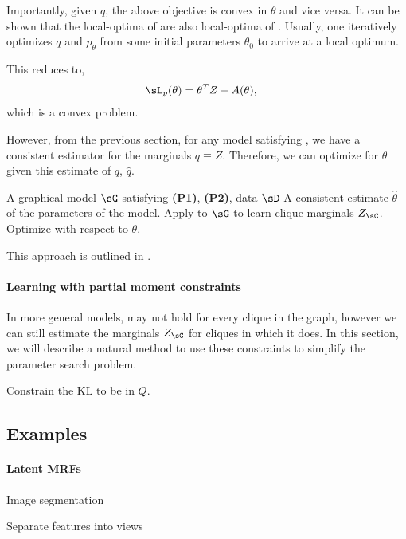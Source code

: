 Importantly, given $q$, the above objective is convex in $\theta$ and vice versa.
It can be shown\cite{} that the local-optima of 
are also local-optima of . Usually, one
iteratively optimizes $q$ and $p_\theta$ from some initial parameters
$\theta_0$ to arrive at a local optimum.

This reduces to,
\begin{align}
  \sL_p(\theta) &= \theta^T Z - A(\theta),
\end{align}
which is a convex problem.

However, from the previous section, for any model satisfying
  , we have a consistent estimator for the
  marginals $q \equiv Z$. 
Therefore, we can optimize for $\theta$ given this estimate of $q$,
  $\hat q$.

\renewcommand{\algorithmicrequire}{\textbf{Input:}}
\renewcommand{\algorithmicensure}{\textbf{Output:}}
\begin{algorithm}
  \caption{\LearnLogLinear}
  \label{algo:undirected}
  \begin{algorithmic}
    \REQUIRE A graphical model $\sG$ satisfying \textbf{(P1)}, \textbf{(P2)}, data $\sD$
    \ENSURE A consistent estimate $\hat \theta$ of the parameters of the model.
      \STATE Apply \LearnMarginals to $\sG$ to learn clique marginals $Z_\sC$.
      \STATE Optimize  with respect to $\theta$.
  \end{algorithmic}
\end{algorithm}

This approach is outlined in .


\paragraph{Learning with partial moment constraints}

In more general models,  may not hold for
  every clique in the graph, however we can still estimate the marginals
  $Z_\sC$ for cliques in which it does.
In this section, we will describe a natural method to use these
  constraints to simplify the parameter search problem.

Constrain the KL to be in $Q$. 

\subsection{Examples}

\paragraph{Latent MRFs}

Image segmentation

Separate features into views


